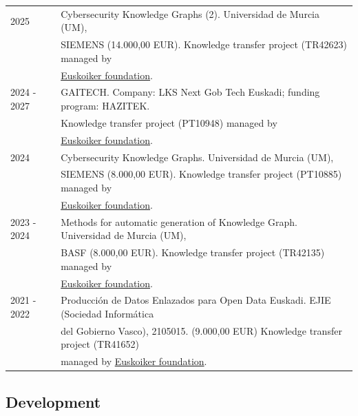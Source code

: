 \documentclass[11pt,fullpage]{article}
\begin{document}
\begin{tabular}{ll}
2025        &  Cybersecurity Knowledge Graphs (2). Universidad de Murcia (UM), \\ 
            &  SIEMENS (14.000,00 EUR). Knowledge transfer project (TR42623) managed by \\ 
            &  \href{http://www.euskoiker.ehu.es/faq-3}{Euskoiker foundation}. \\ 
2024 - 2027 &  GAITECH. Company: LKS Next Gob Tech Euskadi; funding program: HAZITEK. \\ 
            &  Knowledge transfer project (PT10948) managed by \\ 
            &  \href{http://www.euskoiker.ehu.es/faq-3}{Euskoiker foundation}.\\
2024        &  Cybersecurity Knowledge Graphs. Universidad de Murcia (UM), \\ 
            &  SIEMENS (8.000,00 EUR). Knowledge transfer project (PT10885) managed by \\ 
            &  \href{http://www.euskoiker.ehu.es/faq-3}{Euskoiker foundation}. \\
2023 - 2024 &  Methods for automatic generation of Knowledge Graph. Universidad de Murcia (UM), \\ 
            &  BASF (8.000,00 EUR). Knowledge transfer project (TR42135) managed by \\ 
            &  \href{http://www.euskoiker.ehu.es/faq-3}{Euskoiker foundation}. \\
2021 - 2022 &  Producci\'on de Datos Enlazados para Open Data Euskadi. EJIE (Sociedad Inform\'atica \\ 
            &  del Gobierno Vasco), 2105015. (9.000,00 EUR) Knowledge transfer project (TR41652) \\ 
            &  managed by \href{http://www.euskoiker.ehu.es/faq-3}{Euskoiker foundation}. \\ 
\end{tabular}

\subsection*{Development}
\end{document}
